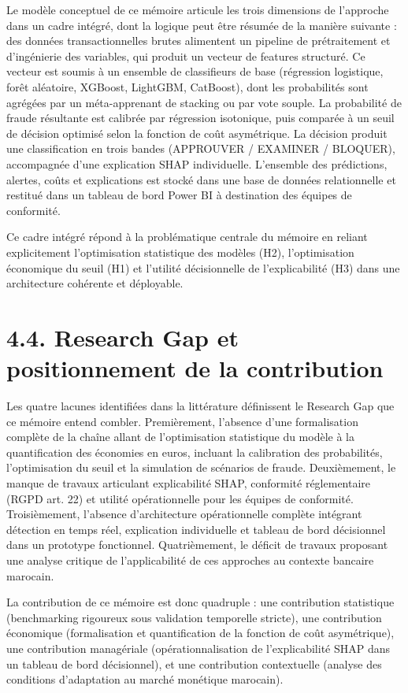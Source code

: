 Le modèle conceptuel de ce mémoire articule les trois dimensions de l'approche dans un cadre intégré, dont la logique peut être résumée de la manière suivante : des données transactionnelles brutes alimentent un pipeline de prétraitement et d'ingénierie des variables, qui produit un vecteur de features structuré. Ce vecteur est soumis à un ensemble de classifieurs de base (régression logistique, forêt aléatoire, XGBoost, LightGBM, CatBoost), dont les probabilités sont agrégées par un méta-apprenant de stacking ou par vote souple. La probabilité de fraude résultante est calibrée par régression isotonique, puis comparée à un seuil de décision optimisé selon la fonction de coût asymétrique. La décision produit une classification en trois bandes (APPROUVER / EXAMINER / BLOQUER), accompagnée d'une explication SHAP individuelle. L'ensemble des prédictions, alertes, coûts et explications est stocké dans une base de données relationnelle et restitué dans un tableau de bord Power BI à destination des équipes de conformité.

Ce cadre intégré répond à la problématique centrale du mémoire en reliant explicitement l'optimisation statistique des modèles (H2), l'optimisation économique du seuil (H1) et l'utilité décisionnelle de l'explicabilité (H3) dans une architecture cohérente et déployable.

\section{4.4. Research Gap et positionnement de la contribution}

Les quatre lacunes identifiées dans la littérature définissent le Research Gap que ce mémoire entend combler. Premièrement, l'absence d'une formalisation complète de la chaîne allant de l'optimisation statistique du modèle à la quantification des économies en euros, incluant la calibration des probabilités, l'optimisation du seuil et la simulation de scénarios de fraude. Deuxièmement, le manque de travaux articulant explicabilité SHAP, conformité réglementaire (RGPD art. 22) et utilité opérationnelle pour les équipes de conformité. Troisièmement, l'absence d'architecture opérationnelle complète intégrant détection en temps réel, explication individuelle et tableau de bord décisionnel dans un prototype fonctionnel. Quatrièmement, le déficit de travaux proposant une analyse critique de l'applicabilité de ces approches au contexte bancaire marocain.

La contribution de ce mémoire est donc quadruple : une contribution statistique (benchmarking rigoureux sous validation temporelle stricte), une contribution économique (formalisation et quantification de la fonction de coût asymétrique), une contribution managériale (opérationnalisation de l'explicabilité SHAP dans un tableau de bord décisionnel), et une contribution contextuelle (analyse des conditions d'adaptation au marché monétique marocain).


